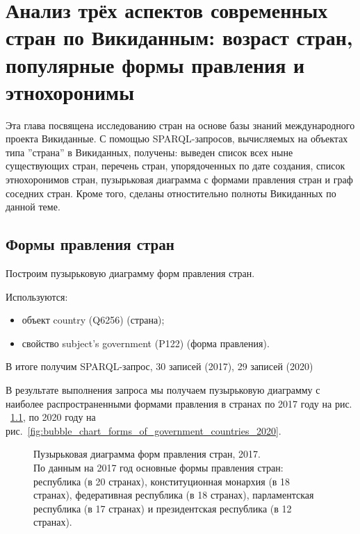 \chapter{Анализ трёх аспектов современных стран по Викиданным: возраст стран, популярные формы правления и этнохоронимы}
\label{ch:country}

Эта глава посвящена исследованию стран на основе базы знаний международного проекта Викиданные. С помощью SPARQL-запросов, вычисляемых на объектах типа ”страна” в Викиданных, получены: выведен список всех ныне существующих стран, перечень стран, упорядоченных по дате создания, список этнохоронимов стран, пузырьковая диаграмма с формами правления стран и граф соседних стран. Кроме того, сделаны отностительно полноты Викиданных по данной теме.

\section{Формы правления стран}

Построим пузырьковую диаграмму форм правления стран.

Используются:
\begin{itemize}
	\item объект country (Q6256) (страна);
	\item свойство subject's government (P122) (форма правления).
\end{itemize}

В итоге получим SPARQL-запрос, 30 записей (2017), 29 записей (2020)

В результате выполнения запроса мы получаем пузырьковую диаграмму с наиболее распространенными формами правления в странах по 2017 году на рис. ~\ref{fig:bubble_chart_forms_of_government_countries_2017}, по 2020 году на рис.~\ref{fig:bubble_chart_forms_of_government_countries_2020}.

\begin{figure}
	{
		\setlength{\fboxsep}{0pt}%
		\setlength{\fboxrule}{1pt}%
	}
	\caption{Пузырьковая диаграмма форм правления стран, 2017.
		\\			
		По данным на 2017 год основные формы правления стран: республика (в 20 странах), конституционная монархия (в 18 странах), федеративная республика (в 18 странах), парламентская республика (в 17 странах) и президентская республика (в 12 странах).}%
	\label{fig:bubble_chart_forms_of_government_countries_2017}%
\end{figure}

